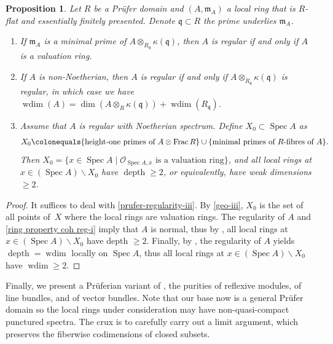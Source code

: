 \documentclass[JEP,XML,SOM,Unicode,published]{cedram}
\newenvironment{enumeratei}
{\bgroup\def\theenumi{\roman{enumi}}\def\theenumii{\arabic{enumii}}\begin{enumerate}}
{\end{enumerate}\egroup}
\let\backslash\smallsetminus
\newcommand{\fm}{\mathfrak{m}}
\newcommand{\fq}{\mathfrak{q}}
\newcommand{\sO}{\mathscr{O}}
\let\ce\colonequals
\let\x\text
\DeclareMathOperator{\Spec}{Spec}
\DeclareMathOperator{\wdim}{wdim}
\DeclareMathOperator{\Frac}{Frac}
\DeclareMathOperator{\depth}{depth}
\newcommand{\bpf}{\begin{proof}}
\newcommand{\epf}{\end{proof}}
\newcommand{\bprop}{\begin{prop}}
\newcommand{\eprop}{\end{prop}}
\newcommand{\benumr}{\begin{enumeratei}}
\newcommand{\eenumr}{\end{enumeratei}}
\theoremstyle{plain}
\newtheorem{prop}[subsection]{Proposition}
\theoremstyle{definition}
\begin{document}
\bprop\label{prufer-regularity}
Let $R$ be a Prüfer domain and $(A,\fm_A)$ a local ring that is $R$-flat and essentially finitely presented.
Denote $\fq\subset R$ the prime underlies $\fm_A$.
\benumr
\item\label{prufer-regularity-i} If $\fm_A$ is a minimal prime of $A\otimes_{R_{\fq}} \kappa(\fq)$, then $A$ is regular if and only if $A$ is a valuation ring.
\item\label{prufer-regularity-ii} If $A$ is non-Noetherian, then $A$ is regular if and only if $A\otimes_{R_{\fq}} \kappa(\fq)$ is regular,
in which case we have $\wdim(A)=\dim(A\otimes_{R}\kappa(\fq))+\wdim(R_{\fq})$.
\item\label{prufer-regularity-iii} Assume that $A$ is regular with Noetherian spectrum. Define $X_0\subset \Spec A$ as
\[
X_0\ce \{\x{height-one primes of $A\otimes \Frac R$}\}\cup \{\x{minimal primes of $R$-fibres of $A$} \}.
\]
Then $X_0=\{x\in \Spec A\mid \x{$\sO_{\Spec A,x}$ is a valuation ring}\}$, and all local rings at $x\in (\Spec A)\backslash X_0$ {have} $\depth \geq 2$, or equivalently, have weak dimensions $\geq 2$.
\eenumr
\eprop
\bpf
It suffices to deal with \eqref{prufer-regularity-iii}.
By \eqref{geo-iii}, $X_0$ is the set of all points of~$X$ where the local rings are valuation rings.
The regularity of $A$ and \eqref{ring property coh reg-i} imply that $A$ is normal, thus by , all local rings at $x\in (\Spec A)\backslash X_0$ have depth $\geq 2$.
Finally, by , the regularity of $A$ yields $\depth=\wdim$ locally on $\Spec A$, thus all local rings at $x\in (\Spec A)\backslash X_0$ have $\wdim\geq 2$.
\epf

Finally, we present a Prüferian variant of , the purities of reflexive modules, of line bundles, and of vector bundles.
Note that our base now is a general Prüfer domain so the local rings under consideration may have non-quasi-compact punctured spectra.
The crux is to carefully carry out a limit argument, which preserves the fiberwise codimensions of closed subsets.
\end{document}
